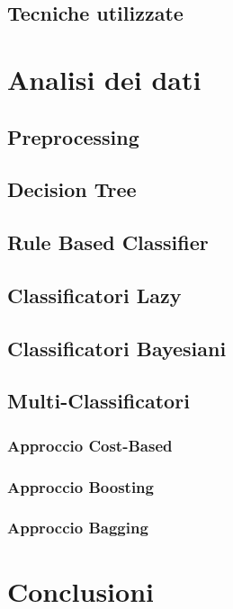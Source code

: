   \subsection{Tecniche utilizzate}	
  \section{Analisi dei dati}
  \subsection{Preprocessing}
  \subsection{Decision Tree}
  \subsection{Rule Based Classifier}
  \subsection{Classificatori Lazy}
  \subsection{Classificatori Bayesiani}
  \subsection{Multi-Classificatori}
  \subsubsection{Approccio Cost-Based}
  \subsubsection{Approccio Boosting}
  \subsubsection{Approccio Bagging}
  \section{Conclusioni}
  

